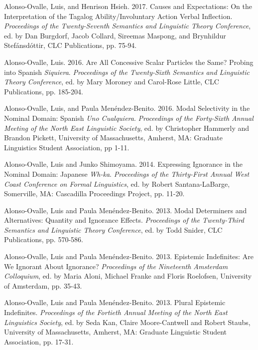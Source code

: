 \documentclass[11pt]{article}
\begin{document}
 Alonso-Ovalle, Luis, and Henrison Hsieh. 2017. Causes and Expectations: On the Interpretation of the Tagalog Ability/Involuntary Action Verbal Inflection. \textit{Proceedings of the Twenty-Seventh Semantics and Linguistic Theory Conference}, ed. by Dan Burgdorf, Jacob Collard, Sireemas Maspong, and Brynhildur Stef\'ansd\'ottir, CLC Publications, pp. 75-94. %

Alonso-Ovalle, Luis. 2016. Are All Concessive Scalar Particles the Same? Probing into Spanish \textit{Siquiera}.  \textit{Proceedings of the Twenty-Sixth
  Semantics and Linguistic Theory Conference}, ed. by Mary Moroney and
Carol-Rose Little, CLC Publications, pp. 185-204. %

Alonso-Ovalle, Luis, and Paula Men\'endez-Benito. 2016. Modal Selectivity
in the Nominal Domain: Spanish \textit{Uno Cualquiera}. \textit{Proceedings
of the Forty-Sixth Annual Meeting of the North East Linguistic Society},
ed. by Christopher Hammerly and Brandon Pickett, University of Massachusetts, Amherst, MA: Graduate Linguistics Student Association, pp 1-11.

Alonso-Ovalle, Luis and Junko Shimoyama. 2014. Expressing Ignorance
in the Nominal Domain: Japanese \textit{Wh-ka}. \textit{Proceedings of
  the Thirty-First Annual West Coast Conference on Formal Linguistics}, ed. by Robert
Santana-LaBarge, Somerville, MA: Cascadilla Proceedings Project, pp. 11-20.

Alonso-Ovalle, Luis and Paula
Men\'endez-Benito. 2013. Modal Determiners and Alternatives:
Quantity and Ignorance Effects.  \textit{Proceedings of the Twenty-Third
  Semantics and Linguistic Theory Conference}, ed. by Todd Snider, CLC
Publications, pp. 570-586. %

Alonso-Ovalle, Luis and Paula
Men\'endez-Benito. 2013. Epistemic Indefinites: Are We Ignorant About
Ignorance? \textit{Proceedings of the Nineteenth Amsterdam Colloquium},
ed. by Maria Aloni, Michael Franke and Floris Roelofsen, University of
Amsterdam, pp. 35-43.

Alonso-Ovalle, Luis and Paula
Men\'endez-Benito. 2013. Plural Epistemic
  Indefinites.  \textit{Proceedings of the Fortieth Annual Meeting of the North East Linguistics
    Society}, ed. by Seda Kan, Claire Moore-Cantwell and Robert
  Staubs, University of Massachusetts, Amherst, MA: Graduate Linguistic Student Association, pp. 17-31.
\end{document}
